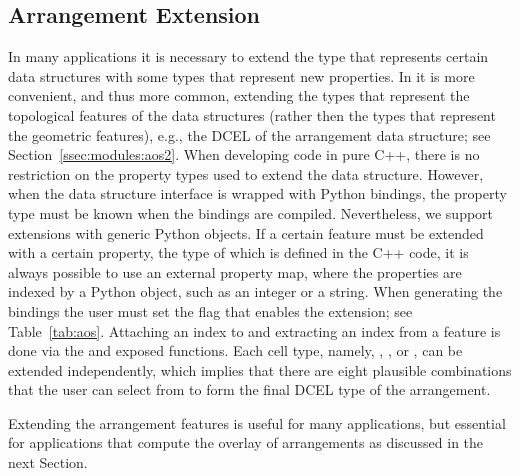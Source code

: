\subsection{Arrangement Extension}
\label{sec:code:ae}
In many applications it is necessary to extend the type that represents certain \cgal{} data structures with some types that represent new properties. In \cgal{} it is more convenient, and thus more common, extending the types that represent the topological features of the data structures (rather then the types that represent the geometric features), e.g., the DCEL of the arrangement data structure; see Section~\ref{ssec:modules:aos2}. When developing code in pure C++, there is no restriction on the property types used to extend the data structure. However, when the data structure interface is wrapped with Python bindings, the property type must be known when the bindings are compiled. Nevertheless, we support extensions with generic Python objects. If a certain feature must be extended with a certain property, the type of which is defined in the C++ code, it is always possible to use an external property map, where the properties are indexed by a Python object, such as an integer or a string. When generating the bindings the user must set the flag that enables the extension; see Table~\ref{tab:aos}. Attaching an index to and extracting an index from a feature is done via the  and  exposed functions. Each cell type, namely, , , or , can be extended independently, which implies that there are eight plausible combinations that the user can select from to form the final DCEL type of the arrangement.

Extending the arrangement features is useful for many applications, but essential for applications that compute the overlay of arrangements as discussed in the next Section.

